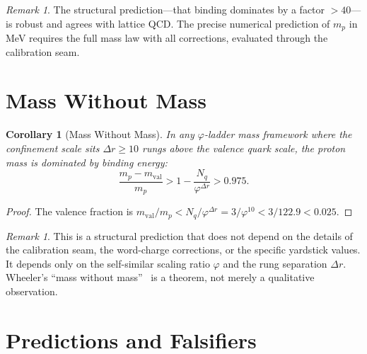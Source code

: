 \documentclass[12pt,a4paper]{article}
\newtheorem{corollary}[theorem]{Corollary}
\theoremstyle{definition}
\theoremstyle{remark}
\newtheorem{remark}[theorem]{Remark}
\begin{document}
\begin{remark}
The structural prediction---that binding dominates by
a factor $> 40$---is robust and agrees with lattice QCD.
The precise numerical prediction of $m_p$ in MeV requires
the full mass law with all corrections, evaluated through the
calibration seam.
\end{remark}

\section{Mass Without Mass}
\label{sec:wheeler}

\begin{corollary}[Mass Without Mass]
\label{thm:wheeler}
In any $\varphi$-ladder mass framework where the confinement
scale sits $\Delta r \geq 10$ rungs above the valence quark
scale, the proton mass is dominated by binding energy:
\begin{equation}
  \frac{m_p - m_{\mathrm{val}}}{m_p} > 1 - \frac{N_q}
  {\varphi^{\Delta r}} > 0.975.
\end{equation}
\end{corollary}

\begin{proof}
The valence fraction is
$m_{\mathrm{val}}/m_p < N_q/\varphi^{\Delta r}
= 3/\varphi^{10} < 3/122.9 < 0.025$.
\end{proof}

\begin{remark}
This is a structural prediction that does not depend on
the details of the calibration seam, the word-charge
corrections, or the specific yardstick values.  It depends
only on the self-similar scaling ratio $\varphi$ and the
rung separation $\Delta r$.  Wheeler's ``mass without
mass''~\cite{Wheeler1962} is a theorem, not merely a
qualitative observation.
\end{remark}

\section{Predictions and Falsifiers}
\label{sec:falsifiers}
\end{document}
